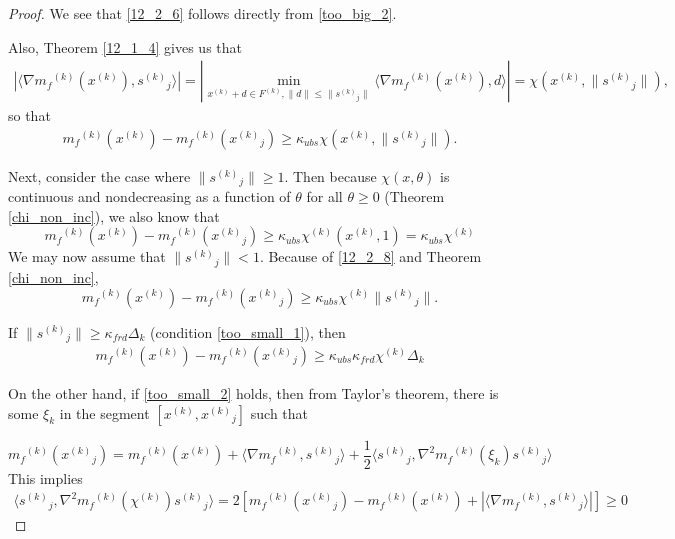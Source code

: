 \documentclass{article}
\theoremstyle{case}
\newcommand{\modelk}{{{m}_f}^{(k)}}
\newcommand{\gradmodelk}{\nabla{{m}_f}^{(k)}}
\newcommand{\iteratek}{{x}^{(k)}}
\newcommand{\feasiblek}{{F}^{(k)}}
\newcommand{\gck}{{{x}^{(k)}}_{GC}}
\newcommand{\sgck}{{{s}^{(k)}}_{GC}}
\newcommand{\chik}{{\chi^{(k)}}}
\newcommand{\xj}{{{x}^{(k)}}_{j}}
\newcommand{\sj}{{{s}^{(k)}}_{j}}
\begin{document}
\begin{proof}

We see that \ref{12_2_6} follows directly from \ref{too_big_2}.

Also, Theorem \ref{12_1_4} gives us that
\begin{align}
|\langle \nabla \modelk(\iteratek), \sj \rangle| =  | \min_{\iteratek+d \in \feasiblek, \|d\| \le \|\sj\|}\langle \gradmodelk(\iteratek), d\rangle| = \chi(\iteratek, \|\sj\|),
\end{align}
so that
\begin{align}
\label{12_2_8}
\modelk(\iteratek) - \modelk(\xj) \ge \kappa_{ubs}\chi(\iteratek, \|\sj\|).
\end{align}

Next, consider the case where $\|\sj\| \ge 1$.
Then because $\chi(x, \theta)$ is continuous and nondecreasing as a function of $\theta$ for all $\theta \ge 0$ (Theorem \ref{chi_non_inc}),
we also know that
\[
\modelk(\iteratek)-\modelk(\xj) \ge \kappa_{ubs}\chik(\iteratek, 1) = \kappa_{ubs}\chik
\]
We may now assume that $\|\sj\| < 1$.
Because of \ref{12_2_8} and Theorem \ref{chi_non_inc}, 
\[
\modelk(\iteratek) - \modelk(\xj) \ge \kappa_{ubs}\chik\|\sj\|.
\]

If $\|\sj\| \ge \kappa_{frd}\Delta_k$ (condition \ref{too_small_1}), then
\begin{align}
\modelk(\iteratek) - \modelk(\xj) \ge \kappa_{ubs}\kappa_{frd}\chik \Delta_k
\end{align}

On the other hand, if \ref{too_small_2} holds, then from Taylor's theorem, there is some $\xi_k$ in the segment $[\iteratek, \xj]$ such that

\[
\modelk(\xj) = \modelk(\iteratek)  + \langle \gradmodelk, \sj \rangle + \frac 1 2 \langle \sj, \nabla^2\modelk(\xi_k)\sj\rangle
\]
This implies
\begin{align}
\langle \sj, \nabla^2 \modelk(\chik)\sj \rangle = 2 [\modelk(\xj) - \modelk(\iteratek) + |\langle \gradmodelk, \sj\rangle|] \ge 0
\end{align}


\end{proof}
\end{document}
